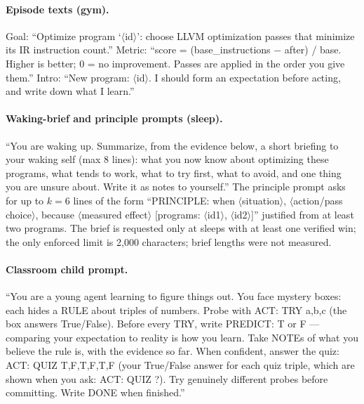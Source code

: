 \documentclass{article}
\begin{document}
\paragraph{Episode texts (gym).} Goal: ``Optimize program `$\langle$id$\rangle$': choose LLVM optimization passes that minimize its IR instruction count.'' Metric: ``score = (base\_instructions $-$ after) / base. Higher is better; 0 = no improvement. Passes are applied in the order you give them.'' Intro: ``New program: $\langle$id$\rangle$. I should form an expectation before acting, and write down what I learn.''

\paragraph{Waking-brief and principle prompts (sleep).} ``You are waking up. Summarize, from the evidence below, a short briefing to your waking self (max 8 lines): what you now know about optimizing these programs, what tends to work, what to try first, what to avoid, and one thing you are unsure about. Write it as notes to yourself.'' The principle prompt asks for up to $k=6$ lines of the form ``PRINCIPLE: when $\langle$situation$\rangle$, $\langle$action/pass choice$\rangle$, because $\langle$measured effect$\rangle$ [programs: $\langle$id1$\rangle$, $\langle$id2$\rangle$]'' justified from at least two programs. The brief is requested only at sleeps with at least one verified win; the only enforced limit is 2{,}000 characters; brief lengths were not measured.

\paragraph{Classroom child prompt.} ``You are a young agent learning to figure things out. You face mystery boxes: each hides a RULE about triples of numbers. Probe with ACT: TRY a,b,c (the box answers True/False). Before every TRY, write PREDICT: T or F --- comparing your expectation to reality is how you learn. Take NOTEs of what you believe the rule is, with the evidence so far. When confident, answer the quiz: ACT: QUIZ T,F,T,F,T,F (your True/False answer for each quiz triple, which are shown when you ask: ACT: QUIZ ?). Try genuinely different probes before committing. Write DONE when finished.''
\end{document}

